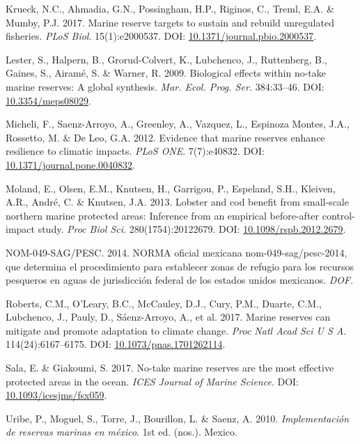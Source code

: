\documentclass[12pt,]{article}
\begin{document}
\hypertarget{ref-krueck_2017-J1}{}
Krueck, N.C., Ahmadia, G.N., Possingham, H.P., Riginos, C., Treml, E.A.
\& Mumby, P.J. 2017. Marine reserve targets to sustain and rebuild
unregulated fisheries. \emph{PLoS Biol}. 15(1):e2000537. DOI:
\href{https://doi.org/10.1371/journal.pbio.2000537}{10.1371/journal.pbio.2000537}.

\hypertarget{ref-lester_2009-Ks}{}
Lester, S., Halpern, B., Grorud-Colvert, K., Lubchenco, J., Ruttenberg,
B., Gaines, S., Airamé, S. \& Warner, R. 2009. Biological effects within
no-take marine reserves: A global synthesis. \emph{Mar. Ecol. Prog.
Ser.} 384:33--46. DOI:
\href{https://doi.org/10.3354/meps08029}{10.3354/meps08029}.

\hypertarget{ref-micheli_2012-EU}{}
Micheli, F., Saenz-Arroyo, A., Greenley, A., Vazquez, L., Espinoza
Montes, J.A., Rossetto, M. \& De Leo, G.A. 2012. Evidence that marine
reserves enhance resilience to climatic impacts. \emph{PLoS ONE}.
7(7):e40832. DOI:
\href{https://doi.org/10.1371/journal.pone.0040832}{10.1371/journal.pone.0040832}.

\hypertarget{ref-moland_2013-VP}{}
Moland, E., Olsen, E.M., Knutsen, H., Garrigou, P., Espeland, S.H.,
Kleiven, A.R., André, C. \& Knutsen, J.A. 2013. Lobster and cod benefit
from small-scale northern marine protected areas: Inference from an
empirical before-after control-impact study. \emph{Proc Biol Sci}.
280(1754):20122679. DOI:
\href{https://doi.org/10.1098/rspb.2012.2679}{10.1098/rspb.2012.2679}.

\hypertarget{ref-nom049sagpesc_2014-V6}{}
NOM-049-SAG/PESC. 2014. NORMA oficial mexicana nom-049-sag/pesc-2014,
que determina el procedimiento para establecer zonas de refugio para los
recursos pesqueros en aguas de jurisdicción federal de los estados
unidos mexicanos. \emph{DOF}.

\hypertarget{ref-roberts_2017-J9}{}
Roberts, C.M., O'Leary, B.C., McCauley, D.J., Cury, P.M., Duarte, C.M.,
Lubchenco, J., Pauly, D., Sáenz-Arroyo, A., et al. 2017. Marine reserves
can mitigate and promote adaptation to climate change. \emph{Proc Natl
Acad Sci U S A}. 114(24):6167--6175. DOI:
\href{https://doi.org/10.1073/pnas.1701262114}{10.1073/pnas.1701262114}.

\hypertarget{ref-sala_2017-69}{}
Sala, E. \& Giakoumi, S. 2017. No-take marine reserves are the most
effective protected areas in the ocean. \emph{ICES Journal of Marine
Science}. DOI:
\href{https://doi.org/10.1093/icesjms/fsx059}{10.1093/icesjms/fsx059}.

\hypertarget{ref-uribe_2010-u2}{}
Uribe, P., Moguel, S., Torre, J., Bourillon, L. \& Saenz, A. 2010.
\emph{Implementación de reservas marinas en méxico}. 1st ed. (nos.).
Mexico.
\end{document}
